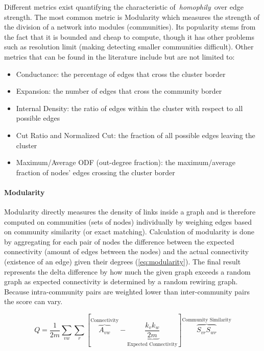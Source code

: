 \documentclass[
acmsmall,
nonacm,
screen,
acmthm]{acmart}
\providecommand{\tightlist}{%
\setlength{\itemsep}{0pt}\setlength{\parskip}{0pt}}
\begin{document}
Different metrics exist quantifying the characteristic
of~\emph{homophily}~over edge strength. The most common metric is
Modularity which measures the strength of the division of a network into
modules (communities). Its popularity stems from the fact that it is
bounded and cheap to compute, though it has other problems such as
resolution limit (making detecting smaller communities difficult). Other
metrics that can be found in the literature include but are not limited
to:

\begin{itemize}
\tightlist
\item
  Conductance: the percentage of edges that cross the cluster border
\item
  Expansion: the number of edges that cross the community border
\item
  Internal Density: the ratio of edges within the cluster with respect
  to all possible edges
\item
  Cut Ratio and Normalized Cut: the fraction of all possible edges
  leaving the cluster
\item
  Maximum/Average ODF (out-degree fraction): the maximum/average
  fraction of nodes' edges crossing the cluster border
\end{itemize}

\hypertarget{modularity}{%
\paragraph{Modularity}\label{modularity}}

Modularity directly measures the density of links inside a graph and is
therefore computed on communities (sets of nodes) individually by
weighing edges based on community similarity (or exact matching).
Calculation of modularity is done by aggregating for each pair of nodes
the difference between the expected connectivity (amount of edges
between the nodes) and the actual connectivity (existence of an edge)
given their degrees (\cref{eq:modularity}). The final result represents
the delta difference by how much the given graph exceeds a random graph
as expected connectivity is determined by a random rewiring graph.
Because intra-community pairs are weighted lower than inter-community
pairs the score can vary.

\begin{equation}
Q=\frac{1}{2 m}\sum_{v w}\sum_{r}\left[\overbrace{A_{v w}}^{\text{Connectivity}}-\underbrace{\frac{k_{v} k_{w}}{2 m}}_{\text{Expected Connectivity}}\right] \overbrace{S_{v r} S_{w r}}^{\text{Community Similarity}}
\label{eq:modularity}\end{equation}
\end{document}
